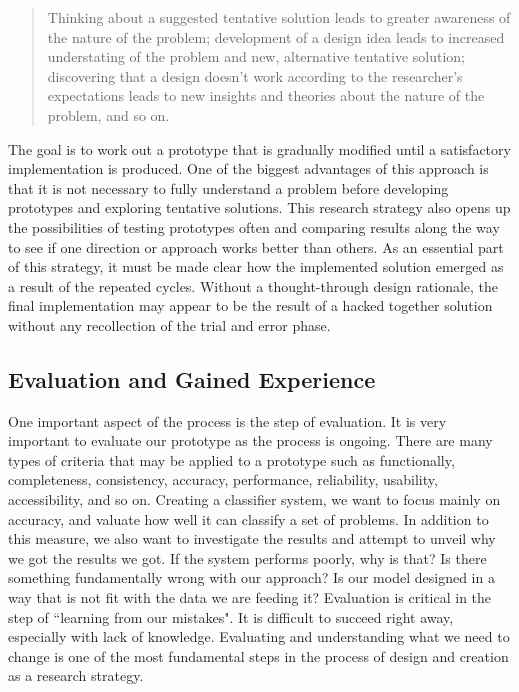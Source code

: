 \begin{quote}
    Thinking about a suggested tentative solution leads to greater awareness of the nature of the problem; development of a design idea leads to increased understating of the problem and new, alternative tentative solution; discovering that a design doesn't work according to the researcher's expectations leads to new insights and theories about the nature of the problem, and so on. 
\end{quote}

The goal is to work out a prototype that is gradually modified until a satisfactory implementation is produced. One of the biggest advantages of this approach is that it is not necessary to fully understand a problem before developing prototypes and exploring tentative solutions. This research strategy also opens up the possibilities of testing prototypes often and comparing results along the way to see if one direction or approach works better than others. As an essential part of this strategy, it must be made clear how the implemented solution emerged as a result of the repeated cycles. Without a thought-through design rationale, the final implementation may appear to be the result of a hacked together solution without any recollection of the trial and error phase.

\subsection{Evaluation and Gained Experience}
\label{sec:evaluation_and_gained_experience}
One important aspect of the process is the step of evaluation. It is very important to evaluate our prototype as the process is ongoing. There are many types of criteria that may be applied to a prototype such as functionally, completeness, consistency, accuracy, performance, reliability, usability, accessibility, and so on. Creating a classifier system, we want to focus mainly on accuracy, and valuate how well it can classify a set of problems. In addition to this measure, we also want to investigate the results and attempt to unveil why we got the results we got. If the system performs poorly, why is that? Is there something fundamentally wrong with our approach? Is our model designed in a way that is not fit with the data we are feeding it? Evaluation is critical in the step of ``learning from our mistakes". It is difficult to succeed right away, especially with lack of knowledge. Evaluating and understanding what we need to change is one of the most fundamental steps in the process of design and creation as a research strategy.

